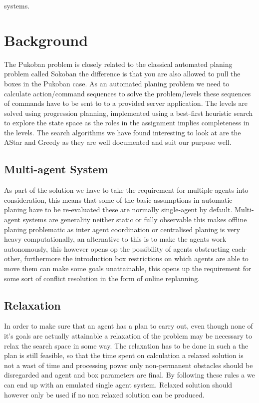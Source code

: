 systems.
\section{Background}
The Pukoban problem is closely related to the classical automated planing problem called Sokoban the difference is that you are also allowed to pull the boxes in the Pukoban case. As an automated planing problem we need to calculate action/command sequences to solve the problem/levels these sequences of commands have to be sent to to a provided server application.
The levels are solved using progression planning, implemented using a best-first heuristic search to explore the state space as the roles in the assignment implies completeness in the levels. The search algorithms we have found interesting to look at are the AStar and Greedy as they are well documented and suit our purpose well.
\subsection{Multi-agent System}
As part of the solution we have to take the requirement for multiple agents into consideration, this means that some of the basic assumptions in automatic planing have to be re-evaluated these are normally single-agent by default.
Multi-agent systems are generality neither static or fully observable this makes offline planing problematic as inter agent coordination or centralised planing is very heavy computationally, an alternative to this is to make the agents work autonomously, this however opens op the possibility of agents obstructing each-other, furthermore the introduction box restrictions on which agents are able to move them can make some goals unattainable, this opens up the requirement for some sort of conflict resolution in the form of online replanning.
\subsection{Relaxation}
In order to make sure that an agent has a plan to carry out, even though none of it's goals are actually attainable a relaxation of the problem may be necessary to relax the search space in some way. The relaxation has to be done in such a the plan is still feasible, so that the time spent on calculation a relaxed solution is not a wast of time and processing power only non-permanent obstacles should be disregarded and  agent and box parameters are final. By following these rules a we can end up with an emulated single agent system.
Relaxed solution should however only be used if no non relaxed solution can be produced. 
